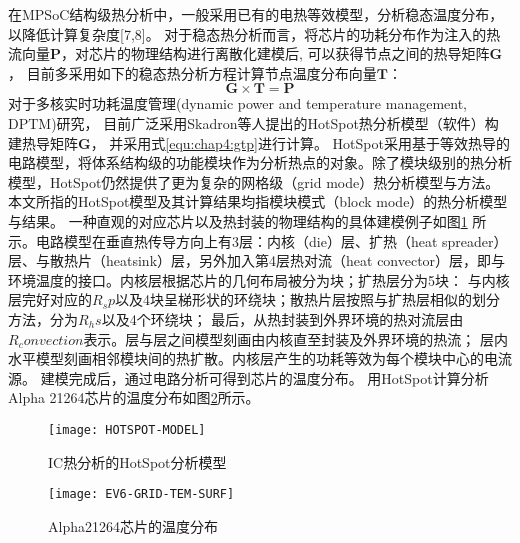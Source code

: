 在MPSoC结构级热分析中，一般采用已有的电热等效模型，分析稳态温度分布，以降低计算复杂度[7,8]。 对于稳态热分析而言，将芯片的功耗分布作为注入的热流向量$\mathbf{P}$，对芯片的物理结构进行离散化建模后, 可以获得节点之间的热导矩阵$\mathbf{G}$， 目前多采用如下的稳态热分析方程计算节点温度分布向量$\mathbf{T}$：
\begin{equation}
\label{equ:chap4:gtp}
\mathbf{G} \times \mathbf{T} = \mathbf{P}
\end{equation}
对于多核实时功耗温度管理(dynamic power and temperature management, DPTM)研究， 目前广泛采用Skadron等人提出的HotSpot热分析模型（软件）构建热导矩阵$\mathbf{G}$， 并采用式\ref{equ:chap4:gtp}进行计算。 HotSpot采用基于等效热导的电路模型，将体系结构级的功能模块作为分析热点的对象。除了模块级别的热分析模型，HotSpot仍然提供了更为复杂的网格级（grid mode）热分析模型与方法。本文所指的HotSpot模型及其计算结果均指模块模式（block mode）的热分析模型与结果。 一种直观的对应芯片以及热封装的物理结构的具体建模例子如图\ref{fig:hotspot-model} 所示。电路模型在垂直热传导方向上有3层：内核（die）层、扩热（heat spreader）层、与散热片（heatsink）层，另外加入第4层热对流（heat convector）层，即与环境温度的接口。内核层根据芯片的几何布局被分为块；扩热层分为5块： 与内核层完好对应的$R_sp$以及4块呈梯形状的环绕块；散热片层按照与扩热层相似的划分方法，分为$R_hs$以及4个环绕块； 最后，从热封装到外界环境的热对流层由$R_convection$表示。层与层之间模型刻画由内核直至封装及外界环境的热流； 层内水平模型刻画相邻模块间的热扩散。内核层产生的功耗等效为每个模块中心的电流源。 建模完成后，通过电路分析可得到芯片的温度分布。 用HotSpot计算分析Alpha 21264芯片的温度分布如图\ref{fig:ev6-grid-temp-surf}所示。

\begin{figure}[H]
  \centering
  \texttt{[image: HOTSPOT-MODEL]}
  \caption{IC热分析的HotSpot分析模型}
  \label{fig:hotspot-model}
\end{figure}

\begin{figure}[H]
  \centering
  \texttt{[image: EV6-GRID-TEM-SURF]}
  \caption{Alpha21264芯片的温度分布}
  \label{fig:ev6-grid-temp-surf}
\end{figure}


